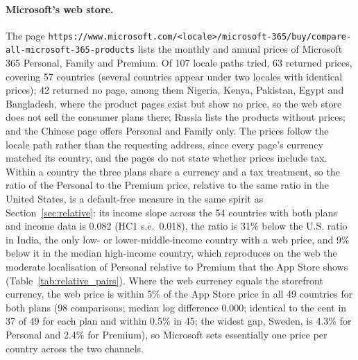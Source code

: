 \documentclass[11pt]{article}
\theoremstyle{definition}
\theoremstyle{remark}
\begin{document}
\paragraph{Microsoft's web store.} The page \nolinkurl{https://www.microsoft.com/<locale>/microsoft-365/buy/compare-all-microsoft-365-products} lists the monthly and annual prices of Microsoft 365 Personal, Family and Premium. Of 107 locale paths tried, 63 returned prices, covering 57 countries (several countries appear under two locales with identical prices); 42 returned no page, among them Nigeria, Kenya, Pakistan, Egypt and Bangladesh, where the product pages exist but show no price, so the web store does not sell the consumer plans there; Russia lists the products without prices; and the Chinese page offers Personal and Family only. The prices follow the locale path rather than the requesting address, since every page's currency matched its country, and the pages do not state whether prices include tax. Within a country the three plans share a currency and a tax treatment, so the ratio of the Personal to the Premium price, relative to the same ratio in the United States, is a default-free measure in the same spirit as Section~\ref{sec:relative}: its income slope across the 54 countries with both plans and income data is 0.082 (HC1 s.e.\ 0.018), the ratio is 31\% below the U.S. ratio in India, the only low- or lower-middle-income country with a web price, and 9\% below it in the median high-income country, which reproduces on the web the moderate localisation of Personal relative to Premium that the App Store shows (Table~\ref{tab:relative_pairs}). Where the web currency equals the storefront currency, the web price is within 5\% of the App Store price in all 49 countries for both plans (98 comparisons; median log difference 0.000; identical to the cent in 37 of 49 for each plan and within 0.5\% in 45; the widest gap, Sweden, is 4.3\% for Personal and 2.4\% for Premium), so Microsoft sets essentially one price per country across the two channels.
\end{document}

